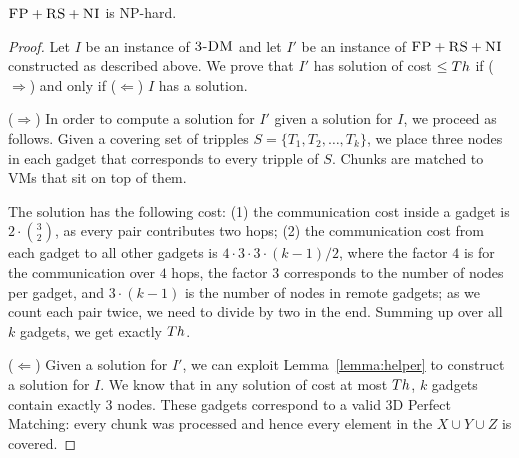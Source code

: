 \begin{theorem}
$\textsc{FP}+\textsc{RS}+\textsc{NI}$ is NP-hard.
\end{theorem}
\begin{proof}
Let $I$ be an instance of $\textsc{3-DM}$ and let $I'$ be an instance of
$\textsc{FP}+\textsc{RS}+\textsc{NI}$ constructed as described above.
We prove that $I'$ has solution of cost $\leq Th$ if ($\Rightarrow$) and only if
($\Leftarrow$)
$I$ has a solution.

($\Rightarrow$) In order to compute a solution
for $I'$ given a solution for $I$, we proceed as follows.
Given a covering set of tripples $S = \{T_1, T_2, \ldots, T_k\}$, we place three nodes in each gadget that
corresponds to every tripple of $S$. Chunks are matched to VMs that sit on top of them.

The solution has the following cost:
(1) the communication cost inside a gadget is $2 \cdot {3 \choose 2}$,
  as every pair contributes two hops;
  (2) the communication cost from each gadget to all other gadgets is $4
  \cdot 3 \cdot 3 \cdot (k - 1) / 2$, where the factor $4$ is
  for the
  communication over $4$ hops, the factor $3$
  corresponds to the number of nodes per gadget, and
  $3 \cdot (k-1)$ is the number of nodes in remote gadgets;
  as we count each pair twice, we need to divide by two in the end.
Summing up over all $k$ gadgets, we get exactly $Th$.

($\Leftarrow$) Given a solution for $I'$,
we can exploit Lemma~\ref{lemma:helper} to construct a solution for $I$.
We know that in any solution of cost at most $Th$,
$k$ gadgets contain exactly 3 nodes. These gadgets correspond to a valid
3D Perfect Matching: every
chunk was processed and hence every element in the $X \cup Y \cup Z$ is covered.
\end{proof}

